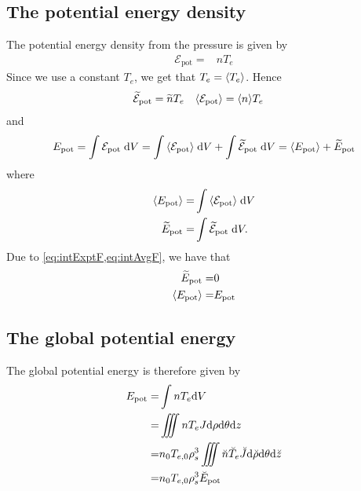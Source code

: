 \subsection{The potential energy density}
The potential energy density from the pressure is given by%
%
\begin{align*}
    \mathcal{E}_{\text{pot}} =& nT_e
\end{align*}
%
Since we use a constant $T_e$, we get that $T_e=\langle{T_e}\rangle$.
Hence
%
\begin{align*}
    &\widetilde{ \mathcal{E}}_{\text{pot}} = \widetilde{ n}T_e&
    &\langle{\mathcal{E}_{\text{pot}}}\rangle = \langle{n}\rangle T_e&
\end{align*}
%
and
%
\begin{align*}
    E_{\text{pot}}
    = \int {\mathcal{E}_{\text{pot}}} \; \text{d} {V}
    = \int {\langle{\mathcal{E}_{\text{pot}}}\rangle} \; \text{d} {V} + \int {\widetilde{ \mathcal{E}}_{\text{pot}}} \; \text{d} {V}
    = \langle{E_{\text{pot}}}\rangle + \widetilde{ E}_{\text{pot}}
\end{align*}
%
where
%
\begin{align*}
    \langle{E_{\text{pot}}}\rangle =& \int {\langle{\mathcal{E}_{\text{pot}}}\rangle} \; \text{d} {V}\\
    \widetilde{ E}_{\text{pot}} =& \int {\widetilde{ \mathcal{E}}_{\text{pot}}} \; \text{d} {V}.
\end{align*}
%
Due to \cref{eq:intExptF,eq:intAvgF}, we have that
%
\begin{align*}
    \widetilde{ E}_{\text{pot}} =& 0\\
    \langle{E_{\text{pot}}}\rangle =& E_{\text{pot}}
\end{align*}

\subsection{The global potential energy}
%
The global potential energy is therefore given by
%
\begin{align*}
    E_{\text{pot}}
    =& \int nT_e \text{d} V
    \\
    =& \iiint nT_e J \text{d}\rho \text{d}\theta \text{d} z
    \\
    =& n_0T_{e,0}\rho_s^3\iiint \breve{n}\breve{T}_e \breve{J} \text{d}\breve{\rho} \text{d}\theta \text{d} \breve{z}
    \\
    =& n_0T_{e,0}\rho_s^3\breve{E}_{\text{pot}}
\end{align*}
